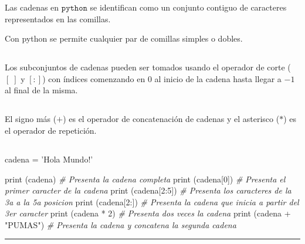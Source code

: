 \documentclass[]{article}
\newenvironment{Shaded}{}{}
\newcommand{\DecValTok}[1]{\textcolor[rgb]{0.25,0.63,0.44}{#1}}
\newcommand{\StringTok}[1]{\textcolor[rgb]{0.25,0.44,0.63}{#1}}
\newcommand{\CommentTok}[1]{\textcolor[rgb]{0.38,0.63,0.69}{\textit{#1}}}
\newcommand{\OperatorTok}[1]{\textcolor[rgb]{0.40,0.40,0.40}{#1}}
\newcommand{\BuiltInTok}[1]{#1}
\newcommand{\NormalTok}[1]{#1}
\begin{document}
Las cadenas en \(\texttt{python}\) se identifican como un conjunto
contiguo de caracteres representados en las comillas.

Con python se permite cualquier par de comillas simples o dobles.

\subsection{}\label{section-24}

Los subconjuntos de cadenas pueden ser tomados usando el operador de
corte (\([\;]\) y \([:]\)) con índices comenzando en \(0\) al inicio de
la cadena hasta llegar a \(-1\) al final de la misma.

\subsection{}\label{section-25}

El signo más (\(+\)) es el operador de concatenación de cadenas y el
asterisco (\(*\)) es el operador de repetición.

\subsection{}\label{section-26}

\begin{Shaded}
\begin{Highlighting}[]
\NormalTok{cadena }\OperatorTok{=} \StringTok{'Hola Mundo!'}

\BuiltInTok{print}\NormalTok{ (cadena)          }\CommentTok{# Presenta la cadena completa}
\BuiltInTok{print}\NormalTok{ (cadena[}\DecValTok{0}\NormalTok{])       }\CommentTok{# Presenta el primer caracter de la cadena}
\BuiltInTok{print}\NormalTok{ (cadena[}\DecValTok{2}\NormalTok{:}\DecValTok{5}\NormalTok{])     }\CommentTok{# Presenta los caracteres de la 3a a la 5a posicion}
\BuiltInTok{print}\NormalTok{ (cadena[}\DecValTok{2}\NormalTok{:])      }\CommentTok{# Presenta la cadena que inicia a partir del 3er caracter}
\BuiltInTok{print}\NormalTok{ (cadena }\OperatorTok{*} \DecValTok{2}\NormalTok{)      }\CommentTok{# Presenta dos veces la cadena}
\BuiltInTok{print}\NormalTok{ (cadena }\OperatorTok{+} \StringTok{"PUMAS"}\NormalTok{) }\CommentTok{# Presenta la cadena y concatena la segunda cadena}
\end{Highlighting}
\end{Shaded}

\begin{center}\rule{0.5\linewidth}{\linethickness}\end{center}
\end{document}
